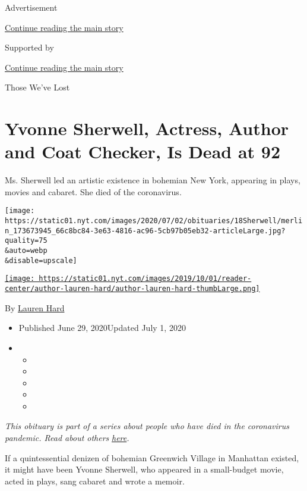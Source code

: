 Advertisement

\protect\hyperlink{after-top}{Continue reading the main story}

Supported by

\protect\hyperlink{after-sponsor}{Continue reading the main story}

Those We've Lost

\hypertarget{yvonne-sherwell-actress-author-and-coat-checker-is-dead-at-92}{%
\section{Yvonne Sherwell, Actress, Author and Coat Checker, Is Dead at
92}\label{yvonne-sherwell-actress-author-and-coat-checker-is-dead-at-92}}

Ms. Sherwell led an artistic existence in bohemian New York, appearing
in plays, movies and cabaret. She died of the coronavirus.

\texttt{[image: https://static01.nyt.com/images/2020/07/02/obituaries/18Sherwell/merlin\_173673945\_66c8bc84-3e63-4816-ac96-5cb97b05eb32-articleLarge.jpg?quality=75\\\&auto=webp\\\&disable=upscale]}

\href{https://www.nytimes.com/by/lauren-hard}{\texttt{[image: https://static01.nyt.com/images/2019/10/01/reader-center/author-lauren-hard/author-lauren-hard-thumbLarge.png]}}

By \href{https://www.nytimes.com/by/lauren-hard}{Lauren Hard}

\begin{itemize}
\item
  Published June 29, 2020Updated July 1, 2020
\item
  \begin{itemize}
  \item
  \item
  \item
  \item
  \item
  \end{itemize}
\end{itemize}

\emph{This obituary is part of a series about people who have died in
the coronavirus pandemic. Read about others}
\href{https://www.nytimes.com/interactive/2020/obituaries/people-died-coronavirus-obituaries.html}{\emph{here}}\emph{.}

If a quintessential denizen of bohemian Greenwich Village in Manhattan
existed, it might have been Yvonne Sherwell, who appeared in a
small-budget movie, acted in plays, sang cabaret and wrote a memoir.

